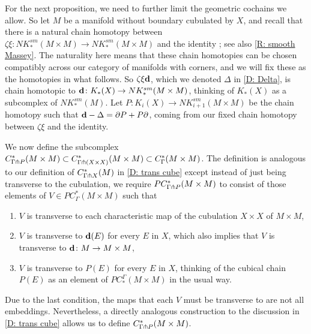 For the next proposition, we need to further limit the geometric cochains we allow.
So let $M$ be a manifold without boundary cubulated by $X$, and recall that there is a natural chain homotopy between $\zeta \xi \colon NK^{sm}_*(M \times M) \to  NK^{sm}_*(M \times M)$ and the identity  \cite[Section XI.5]{Mas91}; see also \cref{R: smooth Massey}.
The naturality here means that these chain homotopies can be chosen compatibly across our category of manifolds with corners, and we will fix these as the homotopies in what follows.
So $\zeta\xi \mathbf{d}$, which we denoted $\Delta$ in \cref{D: Delta}, is chain homotopic to $\mathbf{d} \colon K_*(X) \to NK^{sm}_*(M \times M)$, thinking of $K_*(X)$ as a subcomplex of $NK_*^{sm}(M)$.
Let $P \colon K_i(X) \to NK^{sm}_{i+1}(M \times M)$ be the chain homotopy such that $\mathbf{d} - \Delta = \partial P + P \partial$, coming from our fixed chain homotopy between $\zeta \xi$ and the identity.

We now define the subcomplex $C^*_{\Gamma \pitchfork P}(M \times M) \subset C^*_{\Gamma \pitchfork (X \times X)}(M \times M) \subset C^*_\Gamma(M \times M)$.
The definition is analogous to our definition of $C^*_{\Gamma \pitchfork X}(M)$ in \cref{D: trans cube} except instead of just being transverse to the cubulation, we require
$PC^*_{\Gamma \pitchfork P} (M \times M)$ to consist of those elements of $V \in PC^*_{\Gamma}(M \times M)$ such that
\begin{enumerate}
\item $V$ is transverse to each characteristic map of the cubulation $X \times X$ of $M \times M$,
\item $V$ is transverse to $\mathbf{d}(E)$ for every $E$ in $X$, which also implies that $V$ is transverse to $\mathbf{d} \colon M \to M \times M$,
\item $V$ is transverse to $P(E)$ for every $E$ in $X$, thinking of the cubical chain $P(E)$ as an element of $PC^\Gamma_*(M \times M)$ in the usual way.
\end{enumerate}

Due to the last condition, the maps that each $V$ must be transverse to are not all embeddings.
Nevertheless, a directly analogous construction to the discussion in \cref{D: trans cube} allows us to define $C^*_{\Gamma \pitchfork P} (M \times M)$.

